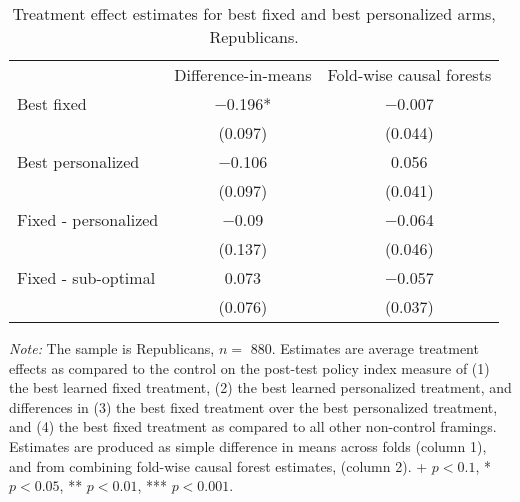 \begin{table*}

\caption{\label{tab:unnamed-chunk-21}Treatment effect estimates for best fixed and best personalized arms, Republicans. \label{tab:best_framing_republicans}}
\centering
\begin{threeparttable}
\begin{tabular}[t]{lcc}
\toprule
 & Difference-in-means & Fold-wise causal forests\\
\cmidrule(lr){2-2} \cmidrule(lr){3-3}
Best fixed & \num{-0.196}* & \num{-0.007}\\
 & (\num{0.097}) & (\num{0.044})\\
\addlinespace
Best personalized & \num{-0.106} & \num{0.056}\\
 & (\num{0.097}) & (\num{0.041})\\
\cmidrule(lr){2-2} \cmidrule(lr){3-3}
\addlinespace
Fixed - personalized & \num{-0.09} & \num{-0.064}\\
 & (\num{0.137}) & (\num{0.046})\\
\addlinespace
Fixed - sub-optimal & \num{0.073} & \num{-0.057}\\
 & (\num{0.076}) & (\num{0.037})\\
\bottomrule
\end{tabular}
\begin{tablenotes}
\item \footnotesize \textit{Note:} The sample is Republicans, $n = $ \num{880}. Estimates are average treatment effects as compared to the control on the post-test policy index measure of (1) the best learned fixed treatment, (2) the best learned personalized treatment, and differences in (3) the best fixed treatment over the best personalized treatment, and (4) the best fixed treatment as compared to all other non-control framings. Estimates are produced as simple difference in means across folds (column 1), and from combining fold-wise causal forest estimates, (column 2). + $p < 0.1$, * $p < 0.05$, ** $p < 0.01$, *** $p < 0.001$.
\end{tablenotes}
\end{threeparttable}
\end{table*}
